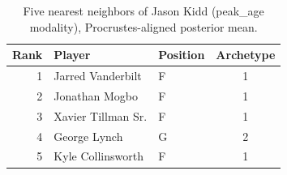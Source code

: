 \begin{table}[htbp]
  \centering\small
  \begin{tabular}{rllc}
    \toprule
    Rank & Player & Position & Archetype \\
    \midrule
    1 & Jarred Vanderbilt & F & 1 \\
    2 & Jonathan Mogbo & F & 1 \\
    3 & Xavier Tillman Sr. & F & 1 \\
    4 & George Lynch & G & 2 \\
    5 & Kyle Collinsworth & F & 1 \\
    \bottomrule
  \end{tabular}
  \caption{Five nearest neighbors of Jason Kidd (peak_age modality), Procrustes-aligned posterior mean.}
  \label{tab:Jason_Kidd_neighbors_peak_age}
\end{table}

